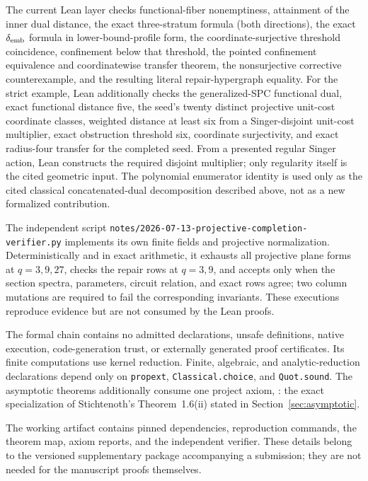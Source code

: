 \documentclass[11pt]{article}
\theoremstyle{definition}
\theoremstyle{remark}
\begin{document}
The current Lean layer checks functional-fiber nonemptiness, attainment of the
inner dual distance, the exact three-stratum formula (both directions), the
exact $\delta_{\rm emb}$ formula in lower-bound-profile form, the
coordinate-surjective threshold coincidence, confinement below that threshold,
the pointed confinement equivalence and coordinatewise transfer theorem, the
nonsurjective corrective counterexample, and the resulting literal
repair-hypergraph equality.  For the strict example,
Lean additionally checks the generalized-SPC functional dual, exact functional
distance five, the seed's twenty distinct projective unit-cost coordinate
classes, weighted distance at least six from a Singer-disjoint unit-cost
multiplier, exact obstruction threshold six, coordinate surjectivity, and exact
radius-four transfer for the completed seed.  From a presented regular Singer
action, Lean constructs the required disjoint multiplier; only regularity
itself is the cited geometric input.  The polynomial enumerator identity is used only as the cited
classical concatenated-dual decomposition described above, not as a new
formalized contribution.

The independent script
\texttt{notes/2026-07-13-projective-completion-verifier.py} implements its
own finite fields and projective normalization.  Deterministically and in
exact arithmetic, it exhausts all projective plane forms at
$q=3,9,27$, checks the repair rows at $q=3,9$, and accepts only when the
section spectra, parameters, circuit relation, and exact rows agree; two
column mutations are required to fail the corresponding invariants.  These
executions reproduce evidence but are not consumed by the Lean proofs.

The formal chain contains no admitted declarations, unsafe definitions,
native execution, code-generation trust, or externally generated proof
certificates.  Its finite computations use kernel reduction.  Finite,
algebraic, and analytic-reduction declarations depend only on
\texttt{propext}, \texttt{Classical.choice}, and \texttt{Quot.sound}.  The
asymptotic theorems additionally consume one project axiom,
: the exact
specialization of Stichtenoth's Theorem~1.6(ii) stated in
Section~\ref{sec:asymptotic}.

The working artifact contains pinned dependencies, reproduction commands,
the theorem map, axiom reports, and the independent verifier.  These details
belong to the versioned supplementary package accompanying a submission;
they are not needed for the manuscript proofs themselves.
\end{document}
